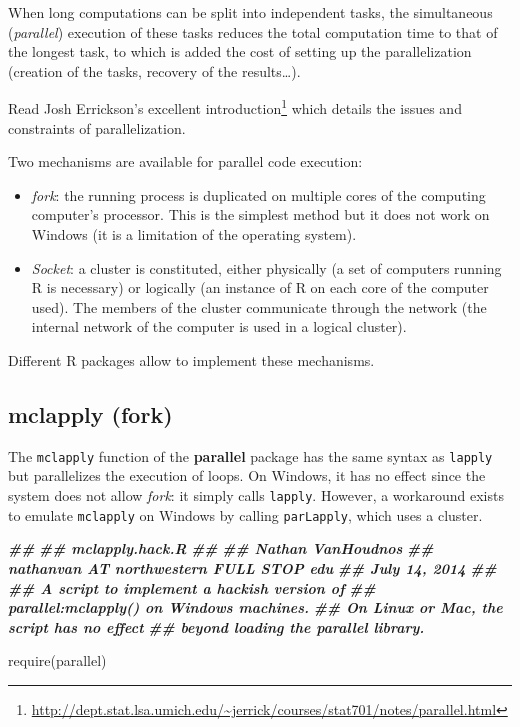 \documentclass[
  12pt,
  american,
  a4paper,
  extrafontsizes,onecolumn,openright
  ]{memoir}
\newenvironment{Shaded}{\begin{snugshade}}{\end{snugshade}}
\newcommand{\DocumentationTok}[1]{\textcolor[rgb]{0.56,0.35,0.01}{\textbf{\textit{#1}}}}
\newcommand{\FunctionTok}[1]{\textcolor[rgb]{0.00,0.00,0.00}{#1}}
\newcommand{\NormalTok}[1]{#1}
\providecommand{\tightlist}{%
  \setlength{\itemsep}{0pt}\setlength{\parskip}{0pt}}
\begin{document}
When long computations can be split into independent tasks, the simultaneous (\emph{parallel}) execution of these tasks reduces the total computation time to that of the longest task, to which is added the cost of setting up the parallelization (creation of the tasks, recovery of the results\ldots).

Read Josh Errickson's excellent introduction\footnote{\url{http://dept.stat.lsa.umich.edu/~jerrick/courses/stat701/notes/parallel.html}} which details the issues and constraints of parallelization.

Two mechanisms are available for parallel code execution:

\begin{itemize}
\tightlist
\item
  \emph{fork}: the running process is duplicated on multiple cores of the computing computer's processor.
  This is the simplest method but it does not work on Windows (it is a limitation of the operating system).
\item
  \emph{Socket}: a cluster is constituted, either physically (a set of computers running R is necessary) or logically (an instance of R on each core of the computer used).
  The members of the cluster communicate through the network (the internal network of the computer is used in a logical cluster).
\end{itemize}

Different R packages allow to implement these mechanisms.

\hypertarget{mclapply-fork}{%
\subsection{mclapply (fork)}\label{mclapply-fork}}

The \texttt{mclapply} function of the \textbf{parallel} package has the same syntax as \texttt{lapply} but parallelizes the execution of loops.
On Windows, it has no effect since the system does not allow \emph{fork}: it simply calls \texttt{lapply}.
However, a workaround exists to emulate \texttt{mclapply} on Windows by calling \texttt{parLapply}, which uses a cluster.

\scriptsize

\begin{Shaded}
\begin{Highlighting}[]
\DocumentationTok{\#\#}
\DocumentationTok{\#\# mclapply.hack.R}
\DocumentationTok{\#\#}
\DocumentationTok{\#\# Nathan VanHoudnos}
\DocumentationTok{\#\# nathanvan AT northwestern FULL STOP edu}
\DocumentationTok{\#\# July 14, 2014}
\DocumentationTok{\#\#}
\DocumentationTok{\#\# A script to implement a hackish version of }
\DocumentationTok{\#\# parallel:mclapply() on Windows machines.}
\DocumentationTok{\#\# On Linux or Mac, the script has no effect}
\DocumentationTok{\#\# beyond loading the parallel library. }

\FunctionTok{require}\NormalTok{(parallel)    }
\end{Highlighting}
\end{Shaded}
\end{document}
